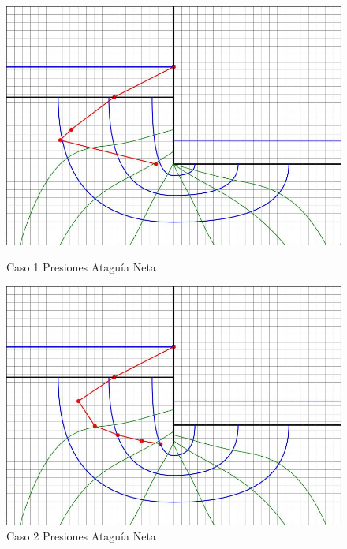 \begin{figure}[H]
  \centering
  \begin{minipage}{0.32\textwidth}
      \centering
      \includegraphics[width=\textwidth]{FOTOS/caso_1_presion_ataquia_neta.jpg}
      \caption{Caso 1 Presiones Ataguía Neta}
  \end{minipage}
  \begin{minipage}{0.32\textwidth}
      \centering
      \includegraphics[width=\textwidth]{FOTOS/caso_2_presion_ataquia_neta.jpg}
      \caption{Caso 2 Presiones Ataguía Neta}
  \end{minipage}
  \begin{minipage}{0.32\textwidth}
      \centering

\end{minipage}
\end{figure}
